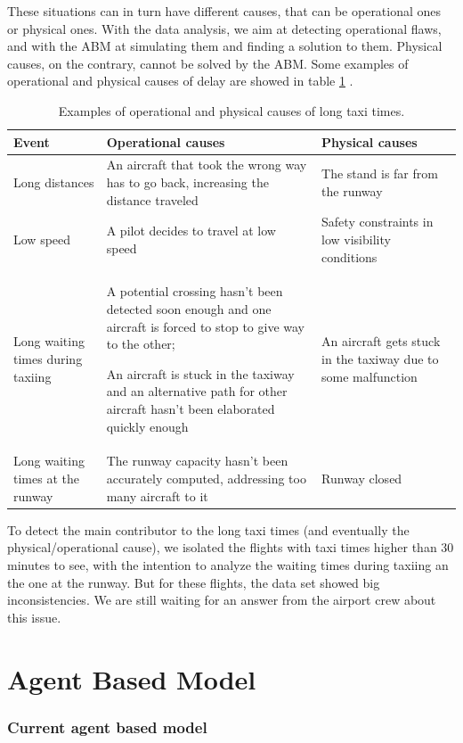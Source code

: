 \documentclass{article}
\begin{document}
These situations can in turn have different causes, that can be operational ones or physical ones. With the data analysis, we aim at detecting operational flaws, and with the ABM at simulating them and finding a solution to them. Physical causes, on the contrary, cannot be solved by the ABM.
Some examples of operational and physical causes of delay are showed in table \ref{causes} .
\begin{table}[h!!!!!!!!!!!!!!!]
	\begin{tabular}{|p{3cm}|p{4cm}|p{4cm}|}
		\hline
		\textbf{Event}& \textbf{Operational causes}& \textbf{Physical causes} \\
		\hline
		Long distances & An aircraft that took the wrong way has to go back, increasing the distance traveled & The stand is far from the runway \\
		\hline
		Low speed & A pilot decides to travel at low speed & Safety constraints in low visibility conditions\\
		\hline
		Long waiting times during taxiing & A potential crossing hasn't been detected soon enough and one aircraft is forced to stop to give way to the other; 
		
		An aircraft is stuck in the taxiway and an alternative path for other aircraft hasn't been elaborated quickly enough & An aircraft gets stuck in the taxiway due to some malfunction \\
		\hline
		Long waiting times at the runway & The runway capacity hasn't been accurately computed, addressing too many aircraft to it & Runway closed\\
		\hline
	\end{tabular}
	\caption{Examples of operational and physical causes of long taxi times.}
	\label{causes}
\end{table}

To detect the main contributor to the long taxi times (and eventually the physical/operational cause), we isolated the flights with taxi times higher than 30 minutes to see, with the intention to analyze the waiting times during taxiing an the one at the runway. But for these flights, the data set showed big inconsistencies. We are still waiting for an answer from the airport crew about this issue.

\newpage
\part{Agent Based Model}

\section{Current agent based model}
\end{document}
